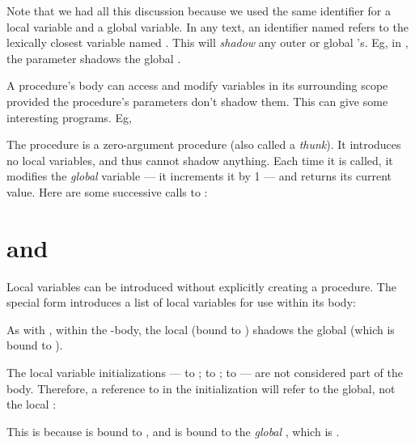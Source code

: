 
Note that we had all this discussion because we used
the same identifier for a local variable and a global
variable.  In any text, an identifier named  refers
to the lexically closest variable named .  This
will {\em shadow} any outer or global 's.  Eg,
in , the parameter  shadows the global
.

A procedure's body can access and modify variables in
its surrounding scope provided the procedure's
parameters don't shadow them.  This can give some
interesting programs.  Eg,


The procedure  is a zero-argument
procedure (also called a {\em thunk}).  It introduces
no local variables, and thus cannot shadow anything.
Each time it is called, it modifies the {\em global}
variable
 --- it increments it by 1 --- and returns
its current value.  Here are some successive calls to
:


\section{ and }

Local variables can be introduced without explicitly
creating a procedure.  The special form 
introduces a list of local variables for use within its
body:


\n As with , within the -body, the local
 (bound to ) shadows the global  (which
is bound to ).

The local variable initializations ---  to ;
 to ;  to  --- are not considered
part of the  body.  Therefore, a reference to
 in the initialization will refer to the global,
not the local :


\n This is because  is bound to , and  is
bound to the {\em global} , which is .

